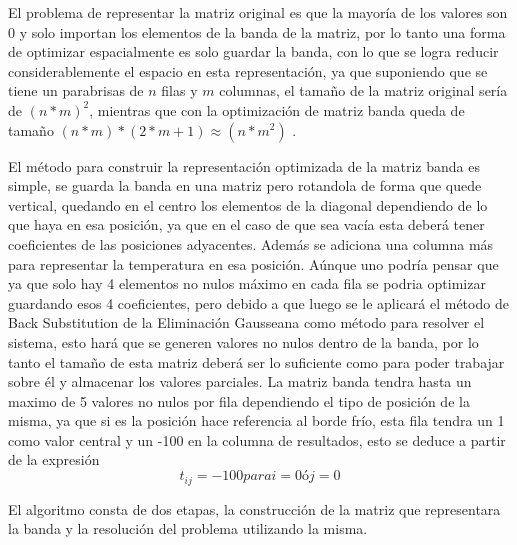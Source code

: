 El problema de representar la matriz original es que la mayoría de los valores son 0 y solo importan los elementos de la banda de la matriz, por lo tanto una forma de optimizar espacialmente es solo guardar la banda, con lo que se logra reducir considerablemente el espacio en esta representación, ya que suponiendo que se tiene un parabrisas de $n$ filas y $m$ columnas, el tamaño de la matriz original sería de $(n*m)^2$, mientras que con la optimización de matriz banda queda de tamaño $(n*m)*(2*m+1) \approx (n*m^2)$ .

El método para construir la representación optimizada de la matriz banda es simple, se guarda la banda en una matriz pero rotandola de forma que quede vertical, quedando en el centro los elementos de la diagonal dependiendo de lo que haya en esa posición, ya que en el caso de que sea vacía esta deberá tener coeficientes de las posiciones adyacentes. Además se adiciona una columna más para representar la temperatura en esa posición.
Aúnque uno podría pensar que ya que solo hay 4 elementos no nulos máximo en cada fila se podria optimizar guardando esos 4 coeficientes, pero debido a que luego se le aplicará el método de Back Substitution de la Eliminación Gausseana como método para resolver el sistema, esto hará que se generen valores no nulos dentro de la banda, por lo tanto el tamaño de esta matriz deberá ser lo suficiente como para poder trabajar sobre él y almacenar los valores parciales.
La matriz banda tendra hasta un maximo de 5 valores no nulos por fila dependiendo el tipo de posición de la misma, ya que si es la posición hace referencia al borde frío, esta fila tendra un 1 como valor central y un -100 en la columna de resultados, esto se deduce a partir de la expresión \[
t_{ij} = -100 para i=0 ó j=0
\]

 

El algoritmo consta de dos etapas, la construcción de la matriz que representara la banda y la resolución del problema utilizando la misma.

